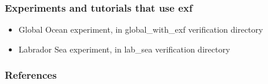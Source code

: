 
\subsubsection{Experiments and tutorials that use exf}
\label{sec:pkg:exf:experiments}

\begin{itemize}
\item{Global Ocean experiment, in global\_with\_exf verification directory }
\item{Labrador Sea experiment, in lab\_sea verification directory }
\end{itemize}


\subsubsection{References}
